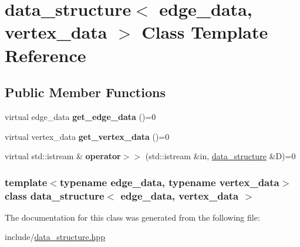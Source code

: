 \hypertarget{classdata__structure}{
\section{data\_\-structure$<$ edge\_\-data, vertex\_\-data $>$ Class Template Reference}
\label{classdata__structure}
}
\subsection*{Public Member Functions}
\begin{DoxyCompactItemize}
\item 
\hypertarget{classdata__structure_a1a7bb17a984cc12a88ee300778448a90}{
virtual edge\_\-data {\bfseries get\_\-edge\_\-data} ()=0}
\label{classdata__structure_a1a7bb17a984cc12a88ee300778448a90}

\item 
\hypertarget{classdata__structure_a62ef63d3a8aaf8bafda318eb1bebb69c}{
virtual vertex\_\-data {\bfseries get\_\-vertex\_\-data} ()=0}
\label{classdata__structure_a62ef63d3a8aaf8bafda318eb1bebb69c}

\item 
\hypertarget{classdata__structure_a852693d3315d84b4c34ad0f86614f7dc}{
virtual std::istream \& {\bfseries operator$>$$>$} (std::istream \&in, \hyperlink{classdata__structure}{data\_\-structure} \&D)=0}
\label{classdata__structure_a852693d3315d84b4c34ad0f86614f7dc}

\end{DoxyCompactItemize}
\subsubsection*{template$<$typename edge\_\-data, typename vertex\_\-data$>$ class data\_\-structure$<$ edge\_\-data, vertex\_\-data $>$}



The documentation for this class was generated from the following file:\begin{DoxyCompactItemize}
\item 
include/\hyperlink{data__structure_8hpp}{data\_\-structure.hpp}\end{DoxyCompactItemize}
